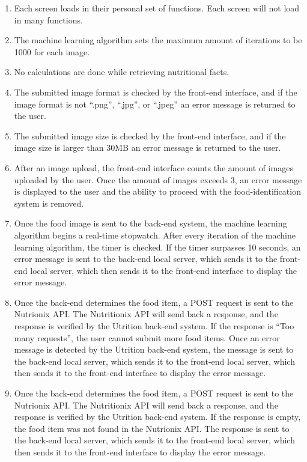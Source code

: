 \documentclass[12pt, titlepage]{article}
\begin{document}
\begin{enumerate}[{PR}1. ]
	\item Each screen loads in their personal set of functions. Each screen will not load in many functions.
	\item The machine learning algorithm sets the maximum amount of iterations to be 1000 for each image.
	\item No calculations are done while retrieving nutritional facts.
	\item The submitted image format is checked by the front-end interface, and if the image format is not “.png”, “.jpg”, or “.jpeg” an error message is returned to the user.
	\item The submitted image size is checked by the front-end interface, and if the image size is larger than 30MB an error message is returned to the user.
	\item After an image upload, the front-end interface counts the amount of images uploaded by the user. Once the amount of images exceeds 3, an error message is displayed to the user and the ability to proceed with the food-identification system is removed.
	\item Once the food image is sent to the back-end system, the machine learning algorithm begins a real-time stopwatch. After every iteration of the machine learning algorithm, the timer is checked. If the timer surpasses 10 seconds, an error message is sent to the back-end local server, which sends it to the front-end local server, which then sends it to the front-end interface to display the error message.
	\item Once the back-end determines the food item, a POST request is sent to the Nutrionix API. The Nutritionix API will send back a response, and the response is verified by the Utrition back-end system. If the response is “Too many requests”, the user cannot submit more food items. Once an error message is detected by the Utrition back-end system, the message is sent to the back-end local server, which sends it to the front-end local server, which then sends it to the front-end interface to display the error message.
	\item Once the back-end determines the food item, a POST request is sent to the Nutrionix API. The Nutritionix API will send back a response, and the response is verified by the Utrition back-end system. If the response is empty, the food item was not found in the Nutrionix API. The response is sent to the back-end local server, which sends it to the front-end local server, which then sends it to the front-end interface to display the error message.

\end{enumerate}
\end{document}
